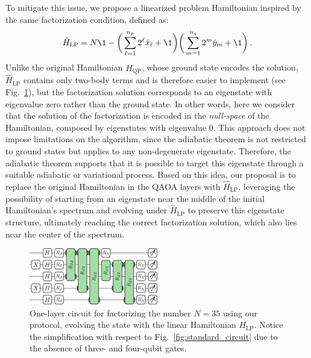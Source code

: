 To mitigate this issue, we propose a linearized problem Hamiltonian inspired by the same factorization condition, defined as:
\begin{equation}
	\hat{H}_\mathrm{LP} = N \1 - \bigg( \sum_{\ell=1}^{n_p} 2^\ell \hat{x}_\ell + \1 \bigg)
	\bigg( \sum_{m=1}^{n_q} 2^m \hat{y}_m + \1 \bigg)\,.
	\label{eq:linear_problem_hamiltonian}
\end{equation}
Unlike the original Hamiltonian $\hat{H}_\mathrm{QP}$, whose ground state encodes the solution, $\hat{H}_\mathrm{LP}$ contains only two-body terms and is therefore easier to implement (see Fig.~\ref{fig:linear_circuit_35.pdf}), but the factorization solution corresponds to an eigenstate with eigenvalue zero rather than the ground state. In other words, here we consider that the solution of the factorization is encoded in the \textit{null-space} of the Hamiltonian, composed by eigenstates with eigenvalue $0$. This approach does not impose limitations on the algorithm, since the adiabatic theorem is not restricted to ground states but applies to any non-degenerate eigenstate. Therefore, the adiabatic theorem supports that it is possible to target this eigenstate through a suitable adiabatic or variational process. Based on this idea, our proposal is to replace the original Hamiltonian in the QAOA layers with $\hat{H}_\mathrm{LP}$, leveraging the possibility of starting from an eigenstate near the middle of the initial Hamiltonian’s spectrum and evolving under $\hat{H}_\mathrm{LP}$ to preserve this eigenstate structure, ultimately reaching the correct factorization solution, which also lies near the center of the spectrum.

\begin{figure}[h]
    \centering
    \includegraphics[width=0.5\textwidth]{02-factorization/figs/linear_circuit_35.pdf}
    \caption{One-layer circuit for factorizing the number $N=35$ using our protocol, evolving the state with the linear Hamiltonian $H_{\mathrm{LP}}$. Notice the simplification with respect to Fig.~\ref{fig:standard_circuit}
    due to the absence of three- and four-qubit gates.}
    \label{fig:linear_circuit_35.pdf}
\end{figure}